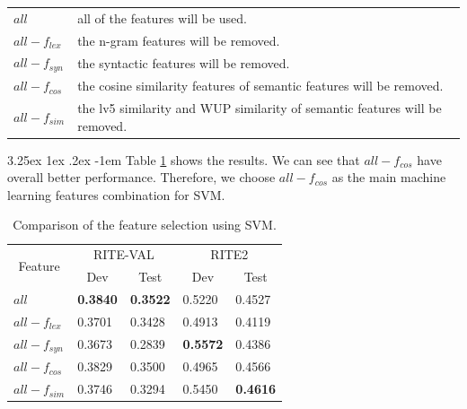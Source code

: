 \documentclass[12pt]{article}
\makeatletter
\renewcommand\paragraph{\@startsection{paragraph}{5}{\z@}%
  {3.25ex \@plus1ex \@minus.2ex}%
  {-1em}%
  {\normalfont\normalsize\bfseries}}
\makeatother
\begin{document}
\begin{CJK*}{UTF8}{bkai}
\begin{spacing}{1.77}
\begin{table}[H]
  \centering
  \setlength{\extrarowheight}{-3pt}
  \begin{tabular}{ll}
    $all$ & all of the features will be used. \\
    $all-f_{lex}$ & the n-gram features will be removed. \\
    $all-f_{syn}$ & the syntactic features will be removed. \\
    $all-f_{cos}$ & the cosine similarity features of semantic features will be removed. \\
    $all-f_{sim}$ & the lv5 similarity and WUP similarity of semantic features will be removed. \\
  \end{tabular}
\end{table}

\paragraph{}
Table \ref{result:ft_select} shows the results. We can see that $all-f_{cos}$ have overall better performance. Therefore, we choose $all-f_{cos}$ as the main machine learning features combination for SVM.

\begin{table}[H]
  \centering
  \setlength{\extrarowheight}{-3pt}
  \caption{Comparison of the feature selection using SVM.}
  \label{result:ft_select}
  \begin{tabular}{|l|l|l|l|l|}
  \hline
  \multicolumn{1}{|c|}{\multirow{2}{*}{Feature}} & \multicolumn{2}{c|}{RITE-VAL} & \multicolumn{2}{c|}{RITE2} \\ \cline{2-5}
  \multicolumn{1}{|c|}{} & \multicolumn{1}{c|}{Dev} & \multicolumn{1}{c|}{Test} & \multicolumn{1}{c|}{Dev} & \multicolumn{1}{c|}{Test} \\ \hline
  $all$ & \textbf{0.3840} & \textbf{0.3522} & 0.5220 & 0.4527 \\ \hline
  $all-f_{lex}$ & 0.3701 & 0.3428 & 0.4913 & 0.4119 \\ \hline
  $all-f_{syn}$ & 0.3673 & 0.2839 & \textbf{0.5572} & 0.4386 \\ \hline
  $all-f_{cos}$ & 0.3829 & 0.3500 & 0.4965 & 0.4566 \\ \hline
  $all-f_{sim}$ & 0.3746 & 0.3294 & 0.5450 & \textbf{0.4616} \\ \hline
  \end{tabular}
\end{table}


\end{spacing}
\end{CJK*}
\end{document}
